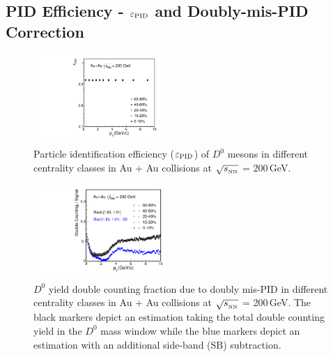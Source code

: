 \documentclass[%
 reprint,	
 amsmath,amssymb,
 aps,
 prc,
]{revtex4-1}
\providecommand{\DIFaddbeginFL}{} %
\providecommand{\DIFaddendFL}{} %
\providecommand{\DIFdelbeginFL}{} %
\providecommand{\DIFdelendFL}{} %
\begin{document}
\subsection{\label{sec:correction:PID}PID Efficiency - $\varepsilon_{\rm PID}$ and Doubly-mis-PID Correction}

\begin{figure}
\centering
\includegraphics[width=0.43\textwidth]{fig/Datad0Eff_pid_10.pdf}
\caption{Particle identification efficiency ($\varepsilon_{\rm PID}$) of $D^0$ mesons in different centrality classes in Au + Au collisions at $\sqrt{s_{_{\rm NN}}}$ = 200\,GeV.}
\label{fig:Datad0Eff_pid} 
\end{figure}

\begin{figure}
\centering
\DIFdelbeginFL %
\DIFdelendFL \DIFaddbeginFL \includegraphics[width=0.45\textwidth]{fig/Double_counting.pdf}
\DIFaddendFL \caption{$D^{0}$ yield double counting fraction due to doubly mis-PID in different centrality classes in Au + Au collisions at $\sqrt{s_{_{\rm NN}}}$ = 200\,GeV. The black markers depict an estimation taking the total double counting yield in the $D^0$ mass window while the blue markers depict an estimation with an additional side-band (SB) subtraction.}
\label{fig:Datad0Eff_doublecounting} 
\end{figure}
\end{document}
